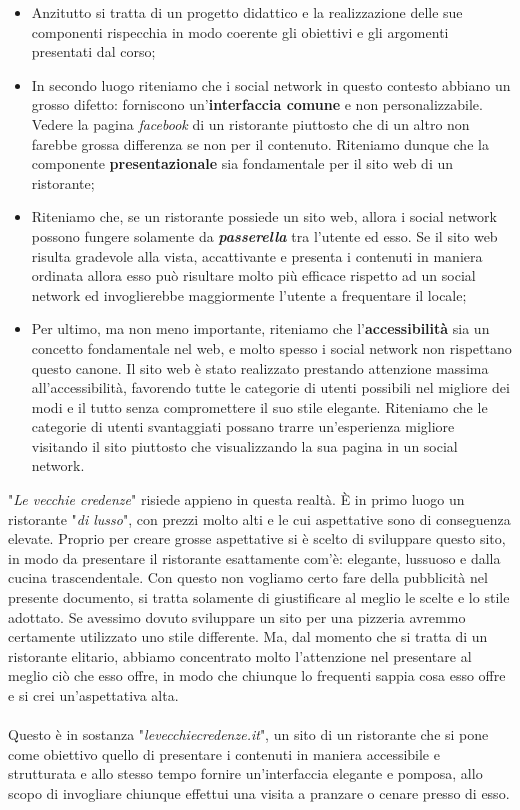 \begin{itemize}

	\item Anzitutto si tratta di un progetto didattico e la realizzazione delle sue componenti rispecchia in modo coerente gli obiettivi e gli argomenti presentati dal corso;
	\item In secondo luogo riteniamo che i social network in questo contesto abbiano un grosso difetto: forniscono un'\textbf{interfaccia comune} e non personalizzabile. Vedere la pagina \textit{facebook} di un ristorante piuttosto che di un altro non farebbe grossa differenza se non per il contenuto. Riteniamo dunque che la componente \textbf{presentazionale} sia fondamentale per il sito web di un ristorante;
	\item Riteniamo che, se un ristorante possiede un sito web, allora i social network possono fungere solamente da \textbf{\textit{passerella}} tra l'utente ed esso. Se il sito web risulta gradevole alla vista, accattivante e presenta i contenuti in maniera ordinata allora esso può risultare molto più efficace rispetto ad un social network ed invoglierebbe maggiormente l'utente a frequentare il locale;
	\item Per ultimo, ma non meno importante, riteniamo che l'\textbf{accessibilità} sia un concetto fondamentale nel web, e molto spesso i social network non rispettano questo canone. Il sito web è stato realizzato prestando attenzione massima all'accessibilità, favorendo tutte le categorie di utenti possibili nel migliore dei modi e il tutto senza compromettere il suo stile elegante. Riteniamo che le categorie di utenti svantaggiati possano trarre un'esperienza migliore visitando il sito piuttosto che visualizzando la sua pagina in un social network.
	
\end{itemize}
"\textit{Le vecchie credenze}" risiede appieno in questa realtà. È in primo luogo un ristorante "\textit{di lusso}", con prezzi molto alti e le cui aspettative sono di conseguenza elevate. Proprio per creare grosse aspettative si è scelto di sviluppare questo sito, in modo da presentare il ristorante esattamente com'è: elegante, lussuoso e dalla cucina trascendentale. Con questo non vogliamo certo fare della pubblicità nel presente documento, si tratta solamente di giustificare al meglio le scelte e lo stile adottato. Se avessimo dovuto sviluppare un sito per una pizzeria avremmo certamente utilizzato uno stile differente. Ma, dal momento che si tratta di un ristorante elitario, abbiamo concentrato molto l'attenzione nel presentare al meglio ciò che esso offre, in modo che chiunque lo frequenti sappia cosa esso offre e si crei un'aspettativa alta.\\ \\
Questo è in sostanza "\textit{levecchiecredenze.it}", un sito di un ristorante che si pone come obiettivo quello di presentare i contenuti in maniera accessibile e strutturata e allo stesso tempo fornire un'interfaccia elegante e pomposa, allo scopo di invogliare chiunque effettui una visita a pranzare o cenare presso di esso.
